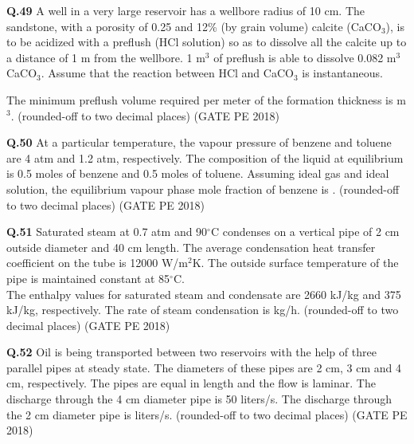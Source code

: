 \documentclass[15pt,a4paper]{article}
\begin{document}
\vspace{1cm}

\noindent\textbf{Q.49} A well in a very large reservoir has a wellbore radius of 10 cm. The sandstone, with a porosity of 0.25 and 12\% (by grain volume) calcite (CaCO$_3$), is to be acidized with a preflush (HCl solution) so as to dissolve all the calcite up to a distance of 1 m from the wellbore. 1 m$^3$ of preflush is able to dissolve 0.082 m$^3$ CaCO$_3$. Assume that the reaction between HCl and CaCO$_3$ is instantaneous. 

The minimum preflush volume required per meter of the formation thickness is \underline{\hspace{2cm}} m$^3$. (rounded-off to two decimal places) \hfill (GATE PE 2018)

\vspace{1cm}

\noindent\textbf{Q.50} At a particular temperature, the vapour pressure of benzene and toluene are 4 atm and 1.2 atm, respectively. The composition of the liquid at equilibrium is 0.5 moles of benzene and 0.5 moles of toluene. Assuming ideal gas and ideal solution, the equilibrium vapour phase mole fraction of benzene is \underline{\hspace{2cm}}. (rounded-off to two decimal places) \hfill (GATE PE 2018)

\pagebreak

\noindent\textbf{Q.51} Saturated steam at 0.7 atm and 90$^\circ$C condenses on a vertical pipe of 2 cm outside diameter and 40 cm length. The average condensation heat transfer coefficient on the tube is 12000 W/m$^2$K. The outside surface temperature of the pipe is maintained constant at 85$^\circ$C. \\ 
The enthalpy values for saturated steam and condensate are 2660 kJ/kg and 375 kJ/kg, respectively. The rate of steam condensation is \underline{\hspace{2cm}} kg/h. (rounded-off to two decimal places) \hfill (GATE PE 2018)

\vspace{1cm}

\noindent\textbf{Q.52} Oil is being transported between two reservoirs with the help of three parallel pipes at steady state. The diameters of these pipes are 2 cm, 3 cm and 4 cm, respectively. The pipes are equal in length and the flow is laminar. The discharge through the 4 cm diameter pipe is 50 liters/s. The discharge through the 2 cm diameter pipe is \underline{\hspace{2cm}} liters/s. (rounded-off to two decimal places) \hfill (GATE PE 2018)
\end{document}
